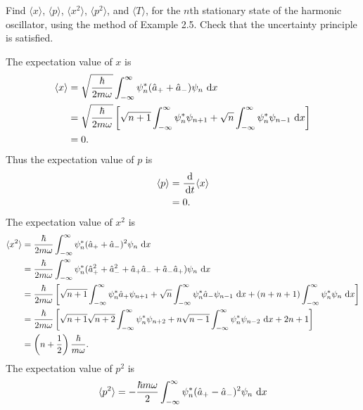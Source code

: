 \documentclass[en, oneside]{vivi}
\begin{document}
\begin{prob}
    Find $\langle x \rangle$, $\langle p \rangle$, $\langle x^2 \rangle$, $\langle p^2 \rangle$, and $\langle T \rangle$, for the $n$th stationary state of the harmonic oscillator, using the method of Example 2.5. 
    Check that the uncertainty principle is satisfied.
\end{prob}

\begin{sol}
    The expectation value of $x$ is
    \begin{align*}
        \langle x \rangle &= \sqrt{\frac{\hbar}{2m\omega}} \int_{-\infty}^{\infty} \psi_n^* (\hat a_+ + \hat a_-) \psi_n \dif x\\
        &= \sqrt{\frac{\hbar}{2m\omega}} \left[ \sqrt{n + 1} \int_{-\infty}^{\infty} \psi_n^* \psi_{n+1} + \sqrt{n} \int_{-\infty}^{\infty} \psi_n^* \psi_{n-1} \dif x \right]\\
        &= 0.
    \end{align*}
    Thus the expectation value of $p$ is 
    \begin{align*}
        \langle p \rangle &= \frac{\dif}{\dif t} \langle x \rangle\\
        &= 0.
    \end{align*}
    The expectation value of $x^2$ is
    \begin{align*}
        \langle x^2 \rangle &= \frac{\hbar}{2m\omega} \int_{-\infty}^{\infty} \psi_n^* (\hat a_+ + \hat a_-)^2 \psi_n \dif x\\
        &= \frac{\hbar}{2m\omega} \int_{-\infty}^{\infty} \psi_n^* (\hat a_+^2 + \hat a_-^2 + \hat a_+ \hat a_- + \hat a_- \hat a_+) \psi_n \dif x\\
        &= \frac{\hbar}{2m\omega} \left[ \sqrt{n+1} \int_{-\infty}^{\infty} \psi_n^* \hat a_+ \psi_{n+1} + \sqrt{n} \int_{-\infty}^{\infty} \psi_n^* \hat a_- \psi_{n-1} \dif x + (n+n+1)\int_{-\infty}^{\infty} \psi_n^* \psi_n \dif x \right]\\
        &= \frac{\hbar}{2m\omega} \left[ \sqrt{n+1} \sqrt{n+2} \int_{-\infty}^{\infty} \psi_n^* \psi_{n+2} + n \sqrt{n-1} \int_{-\infty}^{\infty} \psi_n^* \psi_{n-2} \dif x + 2n+1 \right]\\
        &= \left( n+\frac{1}{2} \right) \frac{\hbar}{m\omega}.
    \end{align*}
    The expectation value of $p^2$ is
    \begin{align*}
        \langle p^2 \rangle &= - \frac{\hbar m \omega}{2} \int_{-\infty}^{\infty} \psi_n^* (\hat a_+ - \hat a_-)^2 \psi_n \dif x\\

\end{align*}
\end{sol}
\end{document}
